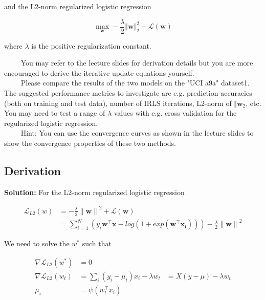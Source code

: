 \documentclass[a4paper]{article}
\begin{document}
and the L2-norm regularized logistic regression


\begin{equation}
    \max_{\pmb{w} } - \frac{\lambda}{2}\Vert{\pmb{w}}\Vert_{2}^{2} + \mathcal{L(\pmb{w})}
\end{equation}

where $\lambda$ is the positive regularization constant.

$\qquad$ You may refer to the lecture slides for derivation details but you are more
encouraged to derive the iterative update equations yourself.\\

$\qquad$ Please compare the results of the two models on the "UCI a9a" dataset1. The suggested performance metrics to investigate are e.g. prediction accuracies (both on training and test data), number of IRLS iterations, L2-norm of $\Vert{\pmb{w}}_2$, etc. You may need to test a range of $\lambda$  values with e.g. cross validation for the regularized logistic regression.\\

$\qquad$ Hint: You can use the convergence curves as shown in the lecture slides to
show the convergence properties of these two methods.


\subsection{Derivation}
\textbf{Solution:} For the L2-norm regularized logistic regression


\begin{equation}
    \begin{aligned}
    \mathcal{L}_{L2}(w) &= - \frac{\lambda}{2}{\lVert{\pmb{w}}\rVert}^2 + \mathcal{L(\pmb{w})}\\
    & = \sum_{i=1}^{N}(y_i\pmb{w}^{\top}\pmb{x} - log(1+exp(\pmb{w}^{\top}\pmb{x_i})))  - \frac{\lambda}{2}{\lVert{\pmb{w}}\rVert}^2 
    \end{aligned}
\end{equation}

We need to solve the $w^*$ such that 

\begin{equation}
    \begin{aligned}
    \nabla{\mathcal{L}_{L2}(w^*)} &=0\\
    \nabla{\mathcal{L}_{L2}(w_t)} &=  \sum_{i} {(y_i - \mu_i) x_i} - \lambda w_t 
    &= X(y-\mu) - \lambda w_t \\
    \mu_i &= \psi(w_t^{\top}x_i)
    \end{aligned}
\end{equation}
\end{document}
